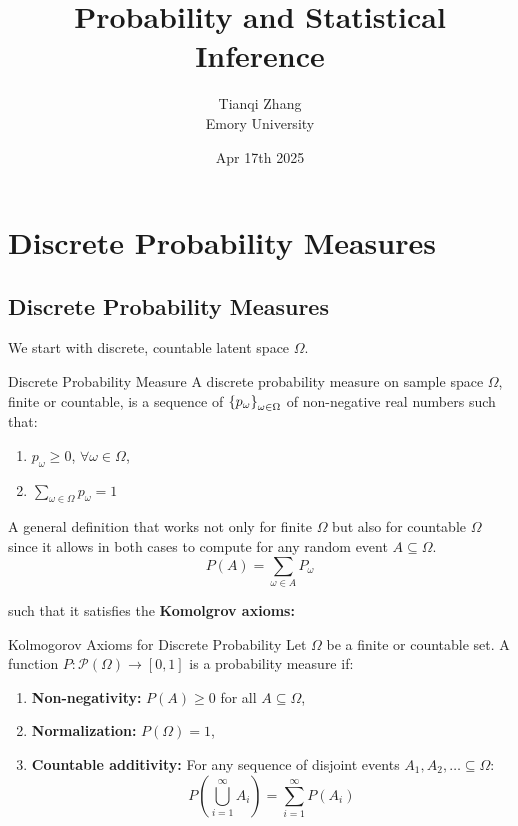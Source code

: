 

\title{\textbf{%
               Probability and Statistical Inference}}
\author{Tianqi Zhang\\
Emory University}
\date{Apr 17th 2025}


\maketitle
\setcounter{section}{2}
\section{Discrete Probability Measures}
\subsection{Discrete Probability Measures}
We start with discrete, countable latent space $\Omega$. \\

\begin{df}{Discrete Probability Measure}
A discrete probability measure on sample space \(\Omega\), finite or countable, is a sequence of \(\qty{p_\omega}_{\omega \in \Omega}\) of non-negative real numbers such that:
\begin{enumerate}
	\item \(p_\omega \geq 0\), \(\forall \omega \in \Omega\),
	\item \(\sum_{\omega \in \Omega} p_\omega = 1\)
\end{enumerate}
A general definition that works not only for finite $\Omega$ but also for countable $\Omega$ since it allows in both cases to compute for any random event $A\subseteq \Omega$. 
$$P(A) = \sum_{\omega\in A}P_\omega$$
\end{df}
such that it satisfies the \textbf{Komolgrov axioms:}

\begin{thm}{Kolmogorov Axioms for Discrete Probability}
Let \( \Omega \) be a finite or countable set. A function \( P: \mathscr{P}(\Omega) \to [0,1] \) is a probability measure if:
\begin{enumerate}
    \item \textbf{Non-negativity:} \( P(A) \geq 0 \) for all \( A \subseteq \Omega \),
    \item \textbf{Normalization:} \( P(\Omega) = 1 \),
    \item \textbf{Countable additivity:} For any sequence of disjoint events $A_1, A_2, \dots \subseteq \Omega$:
$$P\left(\bigcup_{i=1}^{\infty} A_i\right) = \sum_{i=1}^{\infty} P(A_i)$$
\end{enumerate}
\end{thm}



